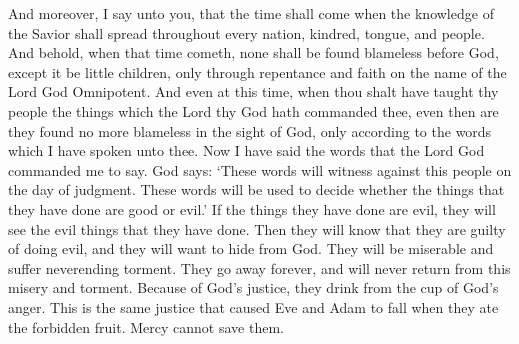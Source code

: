 And moreover, I say unto you, that the time shall come when the knowledge of the Savior shall spread throughout every nation, kindred, tongue, and people.
\bverse \iffalse And behold, when that time cometh, none shall be found blameless before God, except it be little children, only through repentance and faith on the name of the Lord God Omnipotent. \fi
And behold, when that time cometh, none shall be found blameless before God, except it be little children, only through repentance and faith on the name of the Lord God Omnipotent.
\bverse \iffalse And even at this time, when thou shalt have taught thy people the things which the Lord thy God hath commanded thee, even then are they found no more blameless in the sight of God, only according to the words which I have spoken unto thee. \fi
And even at this time, when thou shalt have taught thy people the things which the Lord thy God hath commanded thee, even then are they found no more blameless in the sight of God, only according to the words which I have spoken unto thee.
\bverse \iffalse And now I have spoken the words which the Lord God hath commanded me. \fi
Now I have said the words that the Lord God commanded me to say.
\bverse \iffalse And thus saith the Lord: They shall stand as a bright testimony against this people, at the judgment day; whereof they shall be judged, every man according to his works, whether they be good, or whether they be evil. \fi
God says: \lq These words will witness against this people on the day of judgment. These words will be used to decide whether the things that they have done are good or evil.\rq
\bverse \iffalse And if they be evil they are consigned to an awful view of their own guilt and abominations, which doth cause them to shrink from the presence of the Lord into a state of misery and endless torment, from whence they can no more return; therefore they have drunk damnation to their own souls. \fi
If the things they have done are evil, they will see the evil things that they have done. Then they will know that they are guilty of doing evil, and they will want to hide from God. They will be miserable and suffer neverending torment. They go away forever, and will never return from this misery and torment. 
\bverse \iffalse Therefore, they have drunk out of the cup of the wrath of God, which justice could no more deny unto them than it could deny that Adam should fall because of his partaking of the forbidden fruit; therefore, mercy could have claim on them no more forever. \fi
Because of God's justice, they drink from the cup of God's anger. This is the same justice that caused Eve and Adam to fall when they ate the forbidden fruit. Mercy cannot save them.
